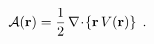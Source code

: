 \begin{equation}
{\mathcal A} ({\bf r})=
\frac{1}{2}
\,
{\bf \nabla}
\!
\cdot
\!
\left\{
{\bf r} \,
 V ({\bf r})
\right\}
\;  .
\label{eq:time_rate_of_dilation_op_ddim}
\end{equation}

